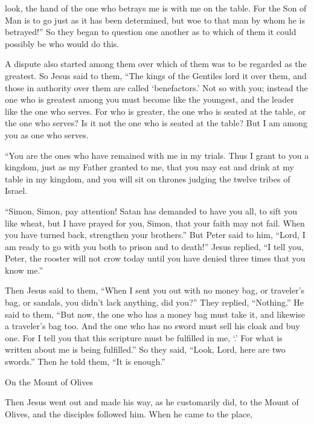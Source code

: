 {look,
the hand
of the one who betrays
me
is with
me
on
the table.
For
the Son
of Man
is to go
just as
it has been determined,
but
woe
to
that
man
by
whom
he is betrayed!”
So
they
began
to question
one another
as to which
of
them
it could possibly be
who would do
this.
\par }{\PP {}A dispute
also
started
among
them
over which
of them
was
to be
regarded
as the greatest.
So
Jesus said
to them,
“The kings
of the Gentiles
lord
it over
them,
and
those in authority over
them
are called
‘benefactors.’
Not
so
with you;
instead
the one who is greatest
among
you
must become
like
the youngest,
and
the leader
like
the one who serves.
For
who is greater,
the one who is seated at the table,
or
the one who serves? Is it not
the one who is seated at the table? But
I
am
among
you
as
one who serves.
\par }{\PP {}“You
are
the ones who have remained
with
me
in
my
trials.
Thus I
grant
to you
a kingdom,
just as
my
Father
granted
to me,
that
you may eat
and
drink
at
my
table
in
my
kingdom,
and
you will sit
on
thrones
judging
the twelve
tribes
of Israel.
\par }{\PP {}“Simon,
Simon,
pay attention! Satan
has demanded
to have you
all, to sift
you like
wheat,
but
I
have prayed
for
you,
Simon, that your
faith
may
not
fail.
When
you
have turned back,
strengthen
your
brothers.”
But
Peter said
to him,
“Lord,
I am
ready
to go
with
you
both
to
prison
and
to
death!”
Jesus replied, “I tell
you,
Peter,
the rooster
will
not
crow
today
until
you have denied
three times
that you know
me.”
\par }{\PP {}Then
Jesus said
to them,
“When
I sent
you
out
with no
money bag,
or
traveler’s bag,
or
sandals,
you
didn’t
lack
anything,
did you?” They replied, “Nothing.”
He said
to them,
“But
now,
the one who has
a money bag
must take
it, and
likewise
a traveler’s bag
too. And
the one who has
no
sword
must sell
his
cloak
and
buy one.
For
I tell
you
that
this
scripture
must
be fulfilled
in
me, ‘{}.’ For
what is written about
me
is being fulfilled.”
So
they said,
“Look,
Lord,
here
are two
swords.”
Then
he told
them,
“It is
enough.”
\par }{\SH On the Mount of Olives
\par }{\PP {}Then
Jesus went out
and made
his way,
as
he customarily
did, to
the Mount
of Olives,
and
the disciples
followed
him.
When
he came
to
the place,
}
